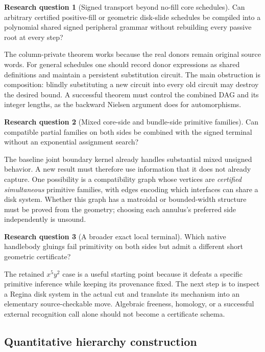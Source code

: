 \documentclass[11pt,a4paper]{article}
\theoremstyle{definition}
\newtheorem{question}{Research question}
\theoremstyle{remark}
\begin{document}
\begin{question}[Signed transport beyond no-fill core schedules]
Can arbitrary certified positive-fill or geometric disk-slide schedules
be compiled into a polynomial shared signed peripheral grammar without
rebuilding every passive root at every step?
\end{question}

The column-private theorem works because the real donors remain original
source words. For general schedules one should record donor expressions as
shared definitions and maintain a persistent substitution circuit. The
main obstruction is composition: blindly substituting a new circuit into
every old circuit may destroy the desired bound. A successful theorem must
control the combined DAG and its integer lengths, as the backward Nielsen
argument does for automorphisms.

\begin{question}[Mixed core-side and bundle-side primitive families]
Can compatible partial families on both sides be combined with the signed
terminal without an exponential assignment search?
\end{question}

The baseline joint boundary kernel already handles substantial mixed
unsigned behavior. A new result must therefore use information that it
does not already capture. One possibility is a compatibility graph whose
vertices are \emph{certified simultaneous} primitive families, with edges
encoding which interfaces can share a disk system. Whether this graph has
a matroidal or bounded-width structure must be proved from the geometry;
choosing each annulus's preferred side independently is unsound.

\begin{question}[A broader exact local terminal]
Which native handlebody gluings fail primitivity on both sides but admit a
different short geometric certificate?
\end{question}

The retained $x^5y^2$ case is a useful starting point because it defeats a
specific primitive inference while keeping its provenance fixed. The
next step is to inspect a Regina disk system in the actual cut and translate
its mechanism into an elementary source-checkable move. Algebraic
freeness, homology, or a successful external recognition call alone should
not become a certificate schema.

\subsection{Quantitative hierarchy construction}
\end{document}

